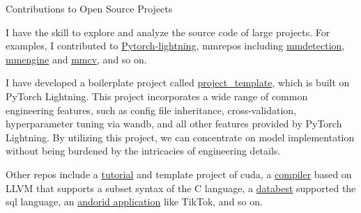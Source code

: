 \begin{cventries}
	\cventry
	{} %
	{Contributions to Open Source Projects} %
	{\hfill} %
	{} %
	{
		\vspace{-3.5mm}
		\begin{cvitems} %
			\item{I have the skill to explore and analyze the source code of large projects. For examples, I contributed to \href{https://github.com/Lightning-AI/lightning}{\textcolor{link}{Pytorch-lightning}}, mmrepos including \href{https://github.com/open-mmlab/mmdetection}{\textcolor{link}{mmdetection}}, \href{https://github.com/open-mmlab/mmengine}{\textcolor{link}{mmengine}} and \href{https://github.com/open-mmlab/mmcv}{\textcolor{link}{mmcv}}, and so on.}
			\item{I have developed a boilerplate project called \href{https://github.com/shenmishajing/project_template}{\textcolor{link}{project\_template}}, which is built on PyTorch Lightning. This project incorporates a wide range of common engineering features, such as config file inheritance, cross-validation, hyperparameter tuning via wandb, and all other features provided by PyTorch Lightning. By utilizing this project, we can concentrate on model implementation without being burdened by the intricacies of engineering details.}
			\item{Other repos include a \href{https://github.com/shenmishajing/pytorch_extension_example}{\textcolor{link}{tutorial}} and template project of cuda, a \href{https://github.com/wuzehua/Compiler}{\textcolor{link}{compiler}} based on LLVM that supports a subset syntax of the C language, a \href{https://github.com/shenmishajing/minisql}{\textcolor{link}{databest}} supported the sql language, an \href{https://github.com/wuzehua/MiniTikTok}{\textcolor{link}{andorid application}} like TikTok, and so on.}
		\end{cvitems}
	}
\end{cventries}
